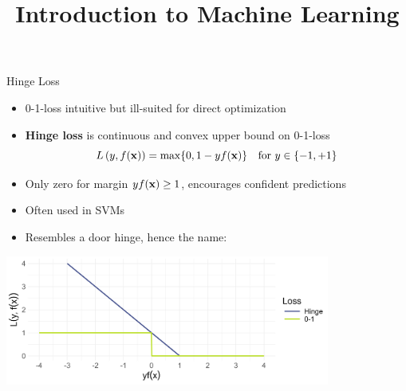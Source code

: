 \documentclass[11pt,compress,t,notes=noshow, xcolor=table]{beamer}
\title{Introduction to Machine Learning}
\begin{document}
    

\begin{vbframe}{Hinge Loss}

\begin{itemize}
  \item 0-1-loss intuitive but ill-suited for direct optimization
  \item \textbf{Hinge loss} is continuous and convex 
  upper bound on 0-1-loss 
  $$L\left(y, f(\mathbf{x})\right) = \max \{ 0, 1 - yf(\mathbf{x}) \} \quad \text{for} \ y \in \{-1, +1\}$$
  \item Only zero for margin $yf(\mathbf{x})\geq 1$, 
  encourages confident predictions
  \item Often used in SVMs %
  \item Resembles a door hinge, hence the name:
\end{itemize}

\begin{center}
\includegraphics[width = 0.8\textwidth]{figure/overview_classif_subset1.png}
\end{center}

\end{vbframe}
\end{document}
